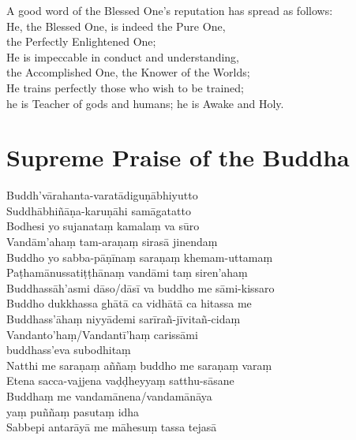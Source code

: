 \begin{leader}
\end{leader}

A good word of the Blessed One's reputation has spread as follows:\\
He, the Blessed One, is indeed the Pure One,\\
\vin the Perfectly Enlightened One;\\
He is impeccable in conduct and understanding,\\
\vin the Accomplished One, the Knower of the Worlds;\\
He trains perfectly those who wish to be trained;\\
\vin he is Teacher of gods and humans; he is Awake and Holy.

\section*{Supreme Praise of the Buddha}

\begin{leader}
\end{leader}

Buddh'vārahanta-varatādiguṇābhiyutto\\
Suddhābhiñāṇa-karuṇāhi samāgatatto\\
Bodhesi yo sujanataṃ kamalaṃ va sūro\\
Vandām'ahaṃ tam-araṇaṃ sirasā jinendaṃ\\
Buddho yo sabba-pāṇīnaṃ saraṇaṃ khemam-uttamaṃ\\
Paṭhamānussatiṭṭhānaṃ vandāmi taṃ siren'ahaṃ\\
Buddhassāh'asmi dāso/dāsī va buddho me sāmi-kissaro\\
Buddho dukkhassa ghātā ca vidhātā ca hitassa me\\
Buddhass'āhaṃ niyyādemi sarīrañ-jīvitañ-cidaṃ\\
Vandanto'haṃ/Vandantī'haṃ carissāmi\\
\vin buddhass'eva subodhitaṃ\\
Natthi me saraṇaṃ aññaṃ buddho me saraṇaṃ varaṃ\\
Etena sacca-vajjena vaḍḍheyyaṃ satthu-sāsane\\
Buddhaṃ me vandamānena/vandamānāya\\
\vin yaṃ puññaṃ pasutaṃ idha\\
Sabbepi antarāyā me māhesuṃ tassa tejasā


